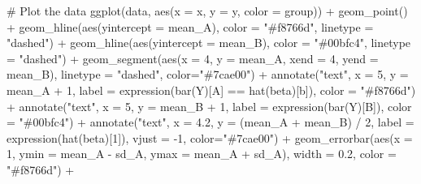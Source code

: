 \documentclass[
  letterpaper,
  DIV=11,
  numbers=noendperiod]{scrartcl}
\newenvironment{Shaded}{\begin{snugshade}}{\end{snugshade}}
\newcommand{\AttributeTok}[1]{\textcolor[rgb]{0.40,0.45,0.13}{#1}}
\newcommand{\CommentTok}[1]{\textcolor[rgb]{0.37,0.37,0.37}{#1}}
\newcommand{\DecValTok}[1]{\textcolor[rgb]{0.68,0.00,0.00}{#1}}
\newcommand{\FloatTok}[1]{\textcolor[rgb]{0.68,0.00,0.00}{#1}}
\newcommand{\FunctionTok}[1]{\textcolor[rgb]{0.28,0.35,0.67}{#1}}
\newcommand{\NormalTok}[1]{\textcolor[rgb]{0.00,0.23,0.31}{#1}}
\newcommand{\SpecialCharTok}[1]{\textcolor[rgb]{0.37,0.37,0.37}{#1}}
\newcommand{\StringTok}[1]{\textcolor[rgb]{0.13,0.47,0.30}{#1}}
\begin{document}
\begin{Shaded}
\begin{Highlighting}[]
\CommentTok{\# Plot the data}
\FunctionTok{ggplot}\NormalTok{(data, }\FunctionTok{aes}\NormalTok{(}\AttributeTok{x =}\NormalTok{ x, }\AttributeTok{y =}\NormalTok{ y, }\AttributeTok{color =}\NormalTok{ group)) }\SpecialCharTok{+}
  \FunctionTok{geom\_point}\NormalTok{() }\SpecialCharTok{+}
  \FunctionTok{geom\_hline}\NormalTok{(}\FunctionTok{aes}\NormalTok{(}\AttributeTok{yintercept =}\NormalTok{ mean\_A), }\AttributeTok{color =} \StringTok{"\#f8766d"}\NormalTok{, }\AttributeTok{linetype =} \StringTok{"dashed"}\NormalTok{) }\SpecialCharTok{+}
  \FunctionTok{geom\_hline}\NormalTok{(}\FunctionTok{aes}\NormalTok{(}\AttributeTok{yintercept =}\NormalTok{ mean\_B), }\AttributeTok{color =} \StringTok{"\#00bfc4"}\NormalTok{, }\AttributeTok{linetype =} \StringTok{"dashed"}\NormalTok{) }\SpecialCharTok{+}
  \FunctionTok{geom\_segment}\NormalTok{(}\FunctionTok{aes}\NormalTok{(}\AttributeTok{x =} \DecValTok{4}\NormalTok{, }\AttributeTok{y =}\NormalTok{ mean\_A, }\AttributeTok{xend =} \DecValTok{4}\NormalTok{, }\AttributeTok{yend =}\NormalTok{ mean\_B), }\AttributeTok{linetype =} \StringTok{"dashed"}\NormalTok{, }\AttributeTok{color=}\StringTok{"\#7cae00"}\NormalTok{) }\SpecialCharTok{+}
  \FunctionTok{annotate}\NormalTok{(}\StringTok{"text"}\NormalTok{, }\AttributeTok{x =} \DecValTok{5}\NormalTok{, }\AttributeTok{y =}\NormalTok{ mean\_A }\SpecialCharTok{+} \DecValTok{1}\NormalTok{, }\AttributeTok{label =} \FunctionTok{expression}\NormalTok{(}\FunctionTok{bar}\NormalTok{(Y)[A] }\SpecialCharTok{==} \FunctionTok{hat}\NormalTok{(beta)[b]), }\AttributeTok{color =} \StringTok{"\#f8766d"}\NormalTok{) }\SpecialCharTok{+}
  \FunctionTok{annotate}\NormalTok{(}\StringTok{"text"}\NormalTok{, }\AttributeTok{x =} \DecValTok{5}\NormalTok{, }\AttributeTok{y =}\NormalTok{ mean\_B }\SpecialCharTok{+} \DecValTok{1}\NormalTok{, }\AttributeTok{label =} \FunctionTok{expression}\NormalTok{(}\FunctionTok{bar}\NormalTok{(Y)[B]), }\AttributeTok{color =} \StringTok{"\#00bfc4"}\NormalTok{) }\SpecialCharTok{+}
  \FunctionTok{annotate}\NormalTok{(}\StringTok{"text"}\NormalTok{, }\AttributeTok{x =} \FloatTok{4.2}\NormalTok{, }\AttributeTok{y =}\NormalTok{ (mean\_A }\SpecialCharTok{+}\NormalTok{ mean\_B) }\SpecialCharTok{/} \DecValTok{2}\NormalTok{, }\AttributeTok{label =} \FunctionTok{expression}\NormalTok{(}\FunctionTok{hat}\NormalTok{(beta)[}\DecValTok{1}\NormalTok{]), }\AttributeTok{vjust =} \SpecialCharTok{{-}}\DecValTok{1}\NormalTok{, }\AttributeTok{color=}\StringTok{"\#7cae00"}\NormalTok{) }\SpecialCharTok{+}
  \FunctionTok{geom\_errorbar}\NormalTok{(}\FunctionTok{aes}\NormalTok{(}\AttributeTok{x =} \DecValTok{1}\NormalTok{, }\AttributeTok{ymin =}\NormalTok{ mean\_A }\SpecialCharTok{{-}}\NormalTok{ sd\_A, }\AttributeTok{ymax =}\NormalTok{ mean\_A }\SpecialCharTok{+}\NormalTok{ sd\_A), }\AttributeTok{width =} \FloatTok{0.2}\NormalTok{, }\AttributeTok{color =} \StringTok{"\#f8766d"}\NormalTok{) }\SpecialCharTok{+}

\end{Highlighting}
\end{Shaded}
\end{document}
